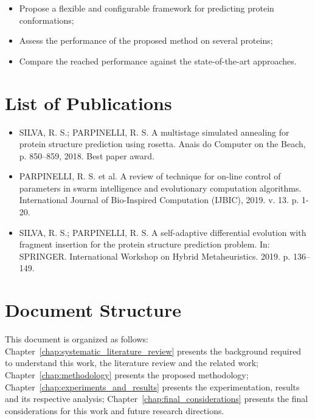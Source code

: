 \begin{itemize}
    \item Propose a flexible and configurable framework for predicting protein conformations;
    \item Assess the performance of the proposed method on several proteins;
    \item Compare the reached performance against the state-of-the-art approaches.
\end{itemize}


\section{List of Publications}\label{sec:list_of_publications}

\begin{itemize}
    \item SILVA, R. S.; PARPINELLI, R. S. A multistage simulated annealing for protein structure prediction using rosetta. Anais do Computer on the Beach, p. 850–859, 2018. Best paper award.
    \item PARPINELLI, R. S. et al. A review of technique for on-line control of parameters in swarm intelligence and evolutionary computation algorithms. International Journal of Bio-Inspired Computation (IJBIC), 2019. v. 13. p. 1-20.
    \item SILVA, R. S.; PARPINELLI, R. S. A self-adaptive differential evolution with fragment insertion  for  the  protein  structure  prediction  problem.  In:  SPRINGER. International Workshop on Hybrid Metaheuristics. 2019. p. 136–149.
\end{itemize}

\section{Document Structure} \label{sec:chap1_document_structure}

This document is organized as follows:
Chapter~\ref{chap:systematic_literature_review} presents the background
required to understand this work, the literature review and the related work;
Chapter~\ref{chap:methodology} presents the proposed methodology;
Chapter~\ref{chap:experiments_and_results} presents the experimentation,
results and its respective analysis;
Chapter~\ref{chap:final_considerations} presents the final considerations for
this work and future research directions.

